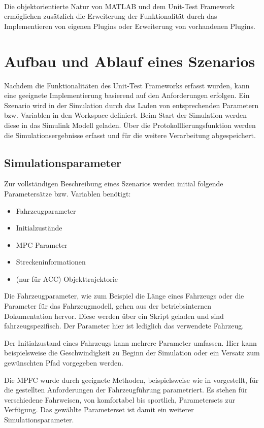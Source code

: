 Die objektorientierte Natur von MATLAB\textsuperscript{\textregistered} und dem Unit-Test Framework ermöglichen zusätzlich die Erweiterung der Funktionalität durch das Implementieren von eigenen Plugins oder Erweiterung von vorhandenen Plugins.

\section{Aufbau und Ablauf eines Szenarios} \label{sec:AufbauSzenario}

Nachdem die Funktionalitäten des Unit-Test Frameworks erfasst wurden, kann eine geeignete Implementierung basierend auf den Anforderungen erfolgen. Ein Szenario wird in der Simulation durch das Laden von entsprechenden Parametern bzw. Variablen in den Workspace definiert. Beim Start der Simulation werden diese in das Simulink Modell geladen. Über die Protokolllierungsfunktion werden die Simulationsergebnisse erfasst und für die weitere Verarbeitung abgespeichert.

\subsection{Simulationsparameter}
Zur vollständigen Beschreibung eines Szenarios werden initial folgende Parametersätze bzw. Variablen benötigt:
\begin{itemize}
	\item Fahrzeugparameter
	\item Initialzustände
	\item MPC Parameter
	\item Streckeninformationen
	\item (nur für ACC) Objekttrajektorie
\end{itemize}

\noindent Die Fahrzeugparameter, wie zum Beispiel die Länge eines Fahrzeugs oder die Parameter für das Fahrzeugmodell, gehen aus der betriebsinternen Dokumentation hervor. Diese werden über ein Skript geladen und sind fahrzeugspezifisch. Der Parameter hier ist lediglich das verwendete Fahrzeug.

Der Initialzustand eines Fahrzeugs kann mehrere Parameter umfassen. Hier kann beispielsweise die Geschwindigkeit zu Beginn der Simulation oder ein Versatz zum gewünschten Pfad vorgegeben werden.

Die MPFC wurde durch geeignete Methoden, beispielsweise wie in \cite{math11020465} vorgestellt, für die gestellten Anforderungen der Fahrzeugführung parametriert. Es stehen für verschiedene Fahrweisen, von komfortabel bis sportlich, Parametersets zur Verfügung. Das gewählte Parameterset ist damit ein weiterer Simulationsparameter.

